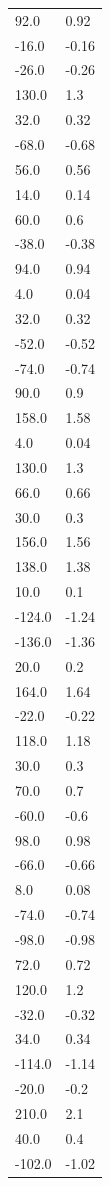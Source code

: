 \begin{longtable}{ll}
92.0 & 0.92 \\
-16.0 & -0.16 \\
-26.0 & -0.26 \\
130.0 & 1.3 \\
32.0 & 0.32 \\
-68.0 & -0.68 \\
56.0 & 0.56 \\
14.0 & 0.14 \\
60.0 & 0.6 \\
-38.0 & -0.38 \\
94.0 & 0.94 \\
4.0 & 0.04 \\
32.0 & 0.32 \\
-52.0 & -0.52 \\
-74.0 & -0.74 \\
90.0 & 0.9 \\
158.0 & 1.58 \\
4.0 & 0.04 \\
130.0 & 1.3 \\
66.0 & 0.66 \\
30.0 & 0.3 \\
156.0 & 1.56 \\
138.0 & 1.38 \\
10.0 & 0.1 \\
-124.0 & -1.24 \\
-136.0 & -1.36 \\
20.0 & 0.2 \\
164.0 & 1.64 \\
-22.0 & -0.22 \\
118.0 & 1.18 \\
30.0 & 0.3 \\
70.0 & 0.7 \\
-60.0 & -0.6 \\
98.0 & 0.98 \\
-66.0 & -0.66 \\
8.0 & 0.08 \\
-74.0 & -0.74 \\
-98.0 & -0.98 \\
72.0 & 0.72 \\
120.0 & 1.2 \\
-32.0 & -0.32 \\
34.0 & 0.34 \\
-114.0 & -1.14 \\
-20.0 & -0.2 \\
210.0 & 2.1 \\
40.0 & 0.4 \\
-102.0 & -1.02 \\

\end{longtable}
